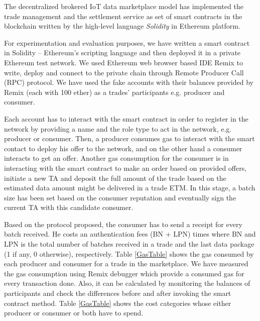 \documentclass[letterpaper, 10 pt, conference]{ieeeconf}  %
\begin{document}
The decentralized brokered IoT data marketplace model has implemented the trade management and the settlement service as set of smart contracts in the blockchain written by the high-level language \textit{Solidity} in Ethereum platform. 

For experimentation and evaluation purposes, we have written a smart contract in Solidity – Ethereum’s scripting language and then deployed it in a private Ethereum test network. We used Ethereum web browser based IDE Remix \cite{25} to write, deploy and connect to the private chain through Remote Producer Call (RPC) protocol. We have used the fake accounts with their balances provided by Remix (each with 100 ether) as a trades’ participants e.g. producer and consumer. 

Each account has to interact with the smart contract in order to register in the network by providing a name and the role type to act in the network, e.g. producer or consumer. Then, a producer consumes gas to interact with the smart contact to deploy his offer to the network, and on the other hand a consumer interacts to get an offer. Another gas consumption for the consumer is in interacting with the smart contract to make an order based on provided offers, initiate a new TA and deposit the full amount of the trade based on the estimated data amount might be delivered in a trade ETM. In this stage, a batch size has been set based on the consumer reputation and eventually sign the current TA with this candidate consumer. 

Based on the protocol proposed, the consumer has to send a receipt for every batch received. He costs an authentication fees (BN + LPN) times where BN and LPN is the total number of batches received in a trade and the last data package (1 if any, 0 otherwise), respectively. Table \ref{GasTable} shows the gas consumed by each producer and consumer for a trade in the marketplace. We have measured the gas consumption using Remix debugger which provide a consumed gas for every transaction done. Also, it can be calculated by monitoring the balances of participants and check the differences before and after invoking the smart contract method. Table \ref{GasTable} shows the cost categories whose either producer or consumer or both have to spend.
\end{document}

